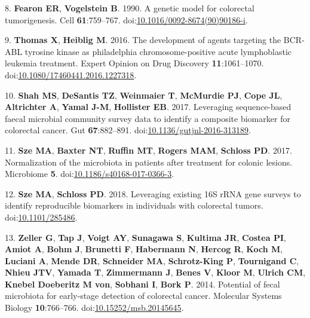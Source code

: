 \documentclass[11pt,]{article}
\begin{document}
\hypertarget{ref-Fearon1990}{}
8. \textbf{Fearon ER}, \textbf{Vogelstein B}. 1990. A genetic model for
colorectal tumorigenesis. Cell \textbf{61}:759--767.
doi:\href{https://doi.org/10.1016/0092-8674(90)90186-i}{10.1016/0092-8674(90)90186-i}.

\hypertarget{ref-Thomas2016}{}
9. \textbf{Thomas X}, \textbf{Heiblig M}. 2016. The development of
agents targeting the BCR-ABL tyrosine kinase as philadelphia
chromosome-positive acute lymphoblastic leukemia treatment. Expert
Opinion on Drug Discovery \textbf{11}:1061--1070.
doi:\href{https://doi.org/10.1080/17460441.2016.1227318}{10.1080/17460441.2016.1227318}.

\hypertarget{ref-Shah2017}{}
10. \textbf{Shah MS}, \textbf{DeSantis TZ}, \textbf{Weinmaier T},
\textbf{McMurdie PJ}, \textbf{Cope JL}, \textbf{Altrichter A},
\textbf{Yamal J-M}, \textbf{Hollister EB}. 2017. Leveraging
sequence-based faecal microbial community survey data to identify a
composite biomarker for colorectal cancer. Gut \textbf{67}:882--891.
doi:\href{https://doi.org/10.1136/gutjnl-2016-313189}{10.1136/gutjnl-2016-313189}.

\hypertarget{ref-normalization_Sze2017}{}
11. \textbf{Sze MA}, \textbf{Baxter NT}, \textbf{Ruffin MT},
\textbf{Rogers MAM}, \textbf{Schloss PD}. 2017. Normalization of the
microbiota in patients after treatment for colonic lesions. Microbiome
\textbf{5}.
doi:\href{https://doi.org/10.1186/s40168-017-0366-3}{10.1186/s40168-017-0366-3}.

\hypertarget{ref-meta_analysis_crc_Sze2018}{}
12. \textbf{Sze MA}, \textbf{Schloss PD}. 2018. Leveraging existing 16S
rRNA gene surveys to identify reproducible biomarkers in individuals
with colorectal tumors.
doi:\href{https://doi.org/10.1101/285486}{10.1101/285486}.

\hypertarget{ref-Zeller2014}{}
13. \textbf{Zeller G}, \textbf{Tap J}, \textbf{Voigt AY},
\textbf{Sunagawa S}, \textbf{Kultima JR}, \textbf{Costea PI},
\textbf{Amiot A}, \textbf{Bohm J}, \textbf{Brunetti F},
\textbf{Habermann N}, \textbf{Hercog R}, \textbf{Koch M},
\textbf{Luciani A}, \textbf{Mende DR}, \textbf{Schneider MA},
\textbf{Schrotz-King P}, \textbf{Tournigand C}, \textbf{Nhieu JTV},
\textbf{Yamada T}, \textbf{Zimmermann J}, \textbf{Benes V},
\textbf{Kloor M}, \textbf{Ulrich CM}, \textbf{Knebel Doeberitz M von},
\textbf{Sobhani I}, \textbf{Bork P}. 2014. Potential of fecal microbiota
for early-stage detection of colorectal cancer. Molecular Systems
Biology \textbf{10}:766--766.
doi:\href{https://doi.org/10.15252/msb.20145645}{10.15252/msb.20145645}.
\end{document}
